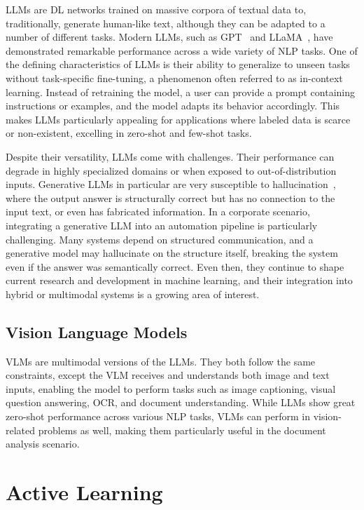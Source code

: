 \glspl{LLM} are \gls{DL} networks trained on massive corpora of textual data to, traditionally, generate human-like text, although they can be adapted to a number of different tasks. Modern LLMs, such as GPT~\cite{brown_language_2020} and LLaMA~\cite{touvron_llama_2023}, have demonstrated remarkable performance across a wide variety of \gls{NLP} tasks. One of the defining characteristics of LLMs is their ability to generalize to unseen tasks without task-specific fine-tuning, a phenomenon often referred to as in-context learning. Instead of retraining the model, a user can provide a prompt containing instructions or examples, and the model adapts its behavior accordingly. This makes LLMs particularly appealing for applications where labeled data is scarce or non-existent, excelling in zero-shot and few-shot tasks.

Despite their versatility, LLMs come with challenges. Their performance can degrade in highly specialized domains or when exposed to out-of-distribution inputs. Generative LLMs in particular are very susceptible to hallucination~\cite{ji_survey_2023}, where the output answer is structurally correct but has no connection to the input text, or even has fabricated information. In a corporate scenario, integrating a generative LLM into an automation pipeline is particularly challenging. Many systems depend on structured communication, and a generative model may hallucinate on the structure itself, breaking the system even if the answer was semantically correct. Even then, they continue to shape current research and development in machine learning, and their integration into hybrid or multimodal systems is a growing area of interest.

\subsection{Vision Language Models}

\glspl{VLM} are multimodal versions of the \glspl{LLM}. They both follow the same constraints, except the \gls{VLM} receives and understands both image and text inputs, enabling the model to perform tasks such as image captioning, visual question answering, \gls{OCR}, and document understanding. While \glspl{LLM} show great zero-shot performance across various \gls{NLP} tasks, \glspl{VLM} can perform in vision-related problems as well, making them particularly useful in the document analysis scenario.

\section{Active Learning}
\label{sec:active_learning}

